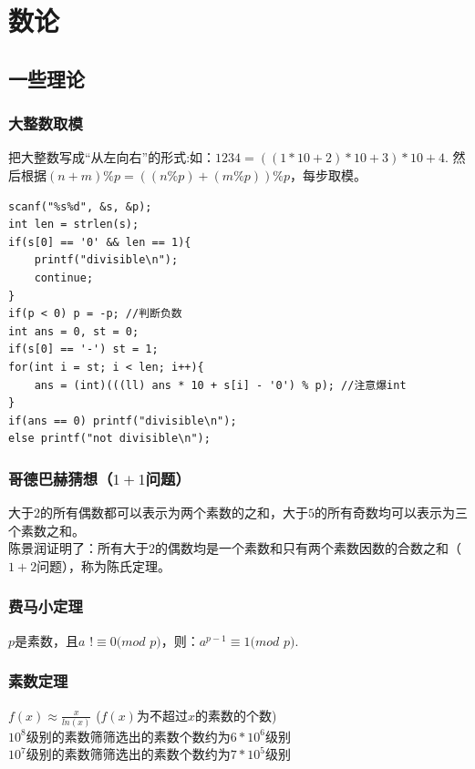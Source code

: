 %
%

\chapter{数论}

\section{一些理论}

\subsection{大整数取模}

把大整数写成“从左向右”的形式:如：$1234 = ((1*10 + 2) * 10 + 3) * 10 + 4$. 然后根据$( n + m) \% p = ((n \% p) + (m \% p)) \% p$，每步取模。

\begin{lstlisting}
scanf("%s%d", &s, &p);
int len = strlen(s);
if(s[0] == '0' && len == 1){
    printf("divisible\n");
    continue;
}
if(p < 0) p = -p; //判断负数
int ans = 0, st = 0;
if(s[0] == '-') st = 1;
for(int i = st; i < len; i++){
    ans = (int)(((ll) ans * 10 + s[i] - '0') % p); //注意爆int
}
if(ans == 0) printf("divisible\n");
else printf("not divisible\n");
\end{lstlisting}

\subsection{哥德巴赫猜想（$1+1$问题）}

大于$2$的所有偶数都可以表示为两个素数的之和，大于$5$的所有奇数均可以表示为三个素数之和。\\
陈景润证明了：所有大于$2$的偶数均是一个素数和只有两个素数因数的合数之和（$1+2$问题），称为陈氏定理。

\subsection{费马小定理}
$p$是素数，且$a$  $!\equiv 0 $$(mod$ $ p)$，则：$a^{p - 1}  \equiv 1 (mod$ $p)$.

\subsection{素数定理}
$f(x) \approx \frac{x}{ln(x)}$ ($f(x) $为不超过$x$的素数的个数) \\
$10^{8}$级别的素数筛筛选出的素数个数约为$6 * 10^{6}$级别 \\
$10^7$级别的素数筛筛选出的素数个数约为$7 * 10^{5}$级别

